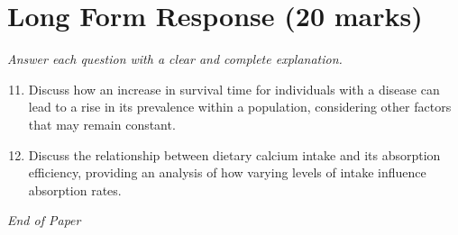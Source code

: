 \documentclass[12pt]{article}
\begin{document}
\section*{Long Form Response (20 marks)}
\textit{Answer each question with a clear and complete explanation.}
\begin{enumerate}[label=\arabic*.]
\setcounter{enumi}{10}
\item Discuss how an increase in survival time for individuals with a disease can lead to a rise in its prevalence within a population, considering other factors that may remain constant.
\item Discuss the relationship between dietary calcium intake and its absorption efficiency, providing an analysis of how varying levels of intake influence absorption rates.
\end{enumerate}

\vfill
\noindent\textit{End of Paper}
\end{document}
